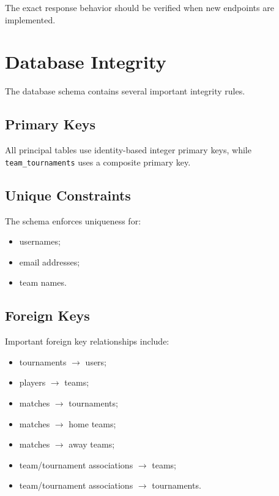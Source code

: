 \documentclass[12pt,a4paper]{article}
\begin{document}
The exact response behavior should be verified when new endpoints are
implemented.


\section{Database Integrity}

The database schema contains several important integrity rules.

\subsection{Primary Keys}

All principal tables use identity-based integer primary keys, while
\texttt{team\_tournaments} uses a composite primary key.

\subsection{Unique Constraints}

The schema enforces uniqueness for:

\begin{itemize}
    \item usernames;
    \item email addresses;
    \item team names.
\end{itemize}

\subsection{Foreign Keys}

Important foreign key relationships include:

\begin{itemize}
    \item tournaments $\rightarrow$ users;
    \item players $\rightarrow$ teams;
    \item matches $\rightarrow$ tournaments;
    \item matches $\rightarrow$ home teams;
    \item matches $\rightarrow$ away teams;
    \item team/tournament associations $\rightarrow$ teams;
    \item team/tournament associations $\rightarrow$ tournaments.
\end{itemize}
\end{document}

